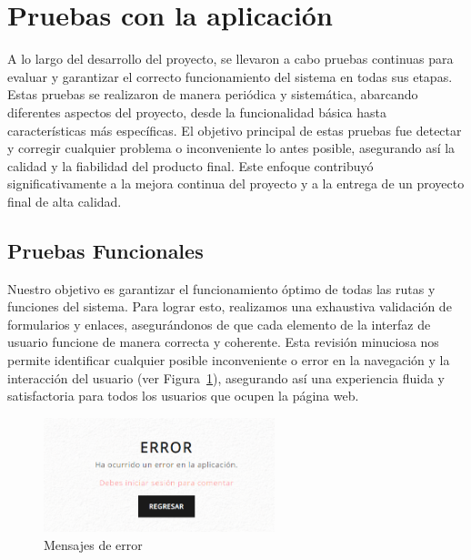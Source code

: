 \documentclass[a4paper, 12pt]{book}
\begin{document}
\section{Pruebas con la aplicación}
\label{sec:pruebas}

A lo largo del desarrollo del proyecto, se llevaron a cabo pruebas continuas para evaluar y garantizar el correcto funcionamiento del 
sistema en todas sus etapas. Estas pruebas se realizaron de manera periódica y sistemática, abarcando diferentes aspectos del proyecto, 
desde la funcionalidad básica hasta características más específicas. El objetivo principal de estas pruebas fue detectar y corregir 
cualquier problema o inconveniente lo antes posible, asegurando así la calidad y la fiabilidad del producto final. Este enfoque 
contribuyó significativamente a la mejora continua del proyecto y a la entrega de un proyecto final de alta calidad.
\subsection{Pruebas Funcionales}
\label{sec:funcionalidad}
Nuestro objetivo es garantizar el funcionamiento óptimo de todas las rutas y funciones del sistema. Para lograr esto, realizamos 
una exhaustiva validación de formularios y enlaces, asegurándonos de que cada elemento de la interfaz de usuario funcione de manera 
correcta y coherente. Esta revisión minuciosa nos permite identificar cualquier posible inconveniente o error en la navegación y la 
interacción del usuario (ver Figura~\ref{fig:errorse}), asegurando así una experiencia fluida y satisfactoria para todos los usuarios que ocupen la página web.

\begin{figure}
  \centering
  \includegraphics[width=0.6\textwidth]{img/error.png}
  \caption{Mensajes de error}
  \label{fig:errorse}
\end{figure}
\end{document}

